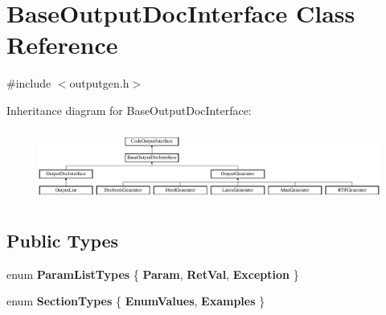 \hypertarget{class_base_output_doc_interface}{}\section{Base\+Output\+Doc\+Interface Class Reference}
\label{class_base_output_doc_interface}


{\ttfamily \#include $<$outputgen.\+h$>$}

Inheritance diagram for Base\+Output\+Doc\+Interface\+:\begin{figure}[H]
\begin{center}
\leavevmode
\includegraphics[height=2.362869cm]{class_base_output_doc_interface}
\end{center}
\end{figure}
\subsection*{Public Types}
\begin{DoxyCompactItemize}
\item 
\mbox{\label{class_base_output_doc_interface_a944ed4d9fb389999c2724eeb321b8c8c}} 
enum {\bfseries Param\+List\+Types} \{ {\bfseries Param}, 
{\bfseries Ret\+Val}, 
{\bfseries Exception}
 \}
\item 
\mbox{\label{class_base_output_doc_interface_a07a3d5df76a714674e070e5e236fe886}} 
enum {\bfseries Section\+Types} \{ {\bfseries Enum\+Values}, 
{\bfseries Examples}
 \}
\end{DoxyCompactItemize}

